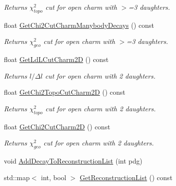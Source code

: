\begin{DoxyCompactItemize}
\begin{DoxyCompactList}\small\item\em Returns $\chi^2_{topo}$ cut for open charm with $>$=3 daughters. \end{DoxyCompactList}\item 
float \hyperlink{classKFParticleFinder_a48f952f9760fd14f8c79817474e9ee35}{Get\+Chi2\+Cut\+Charm\+Manybody\+Decays} () const \hypertarget{classKFParticleFinder_a48f952f9760fd14f8c79817474e9ee35}{}\label{classKFParticleFinder_a48f952f9760fd14f8c79817474e9ee35}

\begin{DoxyCompactList}\small\item\em Returns $\chi^2_{geo}$ cut for open charm with $>$=3 daughters. \end{DoxyCompactList}\item 
float \hyperlink{classKFParticleFinder_a2de92dab28740c91b512c0dab9686fdb}{Get\+Ld\+L\+Cut\+Charm2D} () const \hypertarget{classKFParticleFinder_a2de92dab28740c91b512c0dab9686fdb}{}\label{classKFParticleFinder_a2de92dab28740c91b512c0dab9686fdb}

\begin{DoxyCompactList}\small\item\em Returns $l/\Delta l$ cut for open charm with 2 daughters. \end{DoxyCompactList}\item 
float \hyperlink{classKFParticleFinder_a0f0dfc41131224cb31f516b77747db7d}{Get\+Chi2\+Topo\+Cut\+Charm2D} () const \hypertarget{classKFParticleFinder_a0f0dfc41131224cb31f516b77747db7d}{}\label{classKFParticleFinder_a0f0dfc41131224cb31f516b77747db7d}

\begin{DoxyCompactList}\small\item\em Returns $\chi^2_{topo}$ cut for open charm with 2 daughters. \end{DoxyCompactList}\item 
float \hyperlink{classKFParticleFinder_acd2bb16a15cf086fb0d331c3bf3996cf}{Get\+Chi2\+Cut\+Charm2D} () const \hypertarget{classKFParticleFinder_acd2bb16a15cf086fb0d331c3bf3996cf}{}\label{classKFParticleFinder_acd2bb16a15cf086fb0d331c3bf3996cf}

\begin{DoxyCompactList}\small\item\em Returns $\chi^2_{geo}$ cut for open charm with 2 daughters. \end{DoxyCompactList}\item 
void \hyperlink{classKFParticleFinder_a14bd3ba6fe98d83134aa731f258c595b}{Add\+Decay\+To\+Reconstruction\+List} (int pdg)
\item 
std\+::map$<$ int, bool $>$ \hyperlink{classKFParticleFinder_adef990eed2497bb1abb22df699e67dbe}{Get\+Reconstruction\+List} () const \hypertarget{classKFParticleFinder_adef990eed2497bb1abb22df699e67dbe}{}\label{classKFParticleFinder_adef990eed2497bb1abb22df699e67dbe}


\end{DoxyCompactItemize}
